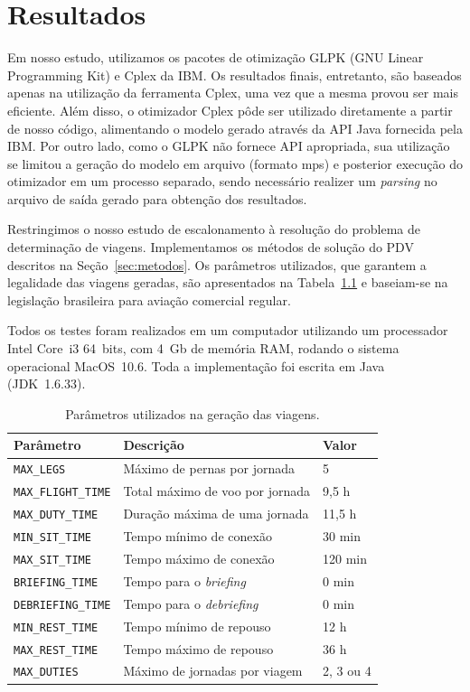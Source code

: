 \zerar
\chapter{Resultados}
\label{cap:resultados}

Em nosso estudo, utilizamos os pacotes de otimização GLPK (GNU Linear Programming Kit) e Cplex da
IBM. Os resultados finais, entretanto, são baseados apenas na utilização da ferramenta Cplex, uma
vez que a mesma provou ser mais eficiente. Além disso, o otimizador Cplex pôde ser utilizado
diretamente a partir de nosso código, alimentando o modelo gerado através da API Java fornecida pela
IBM. Por outro lado, como o GLPK não fornece API apropriada, sua utilização se limitou a geração do
modelo em arquivo (formato mps) e posterior execução do otimizador em um processo separado, sendo
necessário realizer um {\it parsing} no arquivo de saída gerado para obtenção dos resultados.

Restringimos o nosso estudo de escalonamento à resolução do problema de determinação de viagens.
Implementamos os métodos de solução do PDV descritos na Seção~\ref{sec:metodos}. Os parâmetros 
utilizados, que garantem a legalidade das viagens geradas, são apresentados na 
Tabela~\ref{tab:parametros} e baseiam-se na legislação brasileira para aviação comercial regular. 

Todos os testes foram realizados em um computador utilizando um processador Intel Core~i3 64~bits, 
com 4~Gb de memória RAM, rodando o sistema operacional MacOS~10.6. Toda a implementação foi escrita 
em Java (JDK~1.6.33).

\begin{table}
	\begin{center}
		\begin{tabular}{|l|l|l|}
			\hline 
			\bf Parâmetro & \bf Descrição & \bf Valor \\
			\hline \hline 
			\verb|MAX_LEGS| & Máximo de pernas por jornada & 5 \\ \hline
			\verb|MAX_FLIGHT_TIME| & Total máximo de voo por jornada & 9,5 h \\ \hline
			\verb|MAX_DUTY_TIME| & Duração máxima de uma jornada & 11,5 h \\ \hline
			\verb|MIN_SIT_TIME| & Tempo mínimo de conexão & 30 min \\ \hline
			\verb|MAX_SIT_TIME| & Tempo máximo de conexão & 120 min \\ \hline
			\verb|BRIEFING_TIME| & Tempo para o {\it briefing} & 0 min \\ \hline
			\verb|DEBRIEFING_TIME| & Tempo para o {\it debriefing} & 0 min \\ \hline
			\verb|MIN_REST_TIME| & Tempo mínimo de repouso & 12 h \\ \hline
			\verb|MAX_REST_TIME| & Tempo máximo de repouso & 36 h \\ \hline
			\verb|MAX_DUTIES| & Máximo de jornadas por viagem & 2, 3 ou 4 \\ \hline
			\end{tabular} 
			\caption{Parâmetros utilizados na geração das viagens.}
			\label{tab:parametros}
	\end{center}
\end{table}

